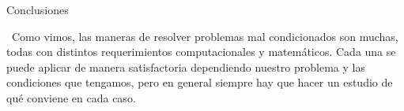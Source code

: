 \documentclass[12pt]{beamer}
\begin{document}
	\begin{frame}{Conclusiones}
		
		\ Como vimos, las maneras de resolver problemas mal condicionados son muchas, todas con distintos requerimientos computacionales y matemáticos. Cada una se puede aplicar de manera satisfactoria dependiendo nuestro problema y las condiciones que tengamos, pero en general siempre hay que hacer un estudio de qué conviene en cada caso.
		
	\end{frame}
	
\end{document}
